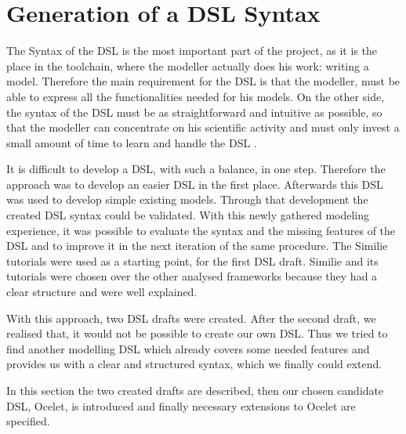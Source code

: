 \chapter{Generation of a DSL Syntax} \label{chap:generation_dsl}
\par
The Syntax of the DSL is the most important part of the project, as it is the place in the toolchain, where the modeller actually does his work: writing a model. Therefore the main requirement for the DSL is that the modeller, must be able to express all the functionalities needed for his models. On the other side, the syntax of the DSL must be as straightforward and intuitive as possible, so that the modeller can concentrate on his scientific activity and must only invest a small amount of time to learn and handle the DSL \autocite{dsl:mernik}.
\par
It is difficult to develop a DSL, with such a balance, in one step. Therefore the approach was to develop an easier DSL in the first place. Afterwards this DSL was used to develop simple existing models. Through that development the created DSL syntax could be validated. With this newly gathered modeling experience, it was possible to evaluate the syntax and the missing features of the DSL and to improve it in the next iteration of the same procedure.
The Similie tutorials were used as a starting point, for the first DSL draft. Similie and its tutorials were chosen over the other analysed frameworks because they had a clear structure and were well explained.
\par
With this approach, two DSL drafts were created. After the second draft, we realised that, it would not be possible to create our own DSL. Thus we tried to find another modelling DSL which already covers some needed features and provides us with a clear and structured syntax, which we finally could extend.
\par
In this section the two created drafts are described, then our chosen candidate DSL, Ocelet, is introduced and finally necessary extensions to Ocelet are specified.

